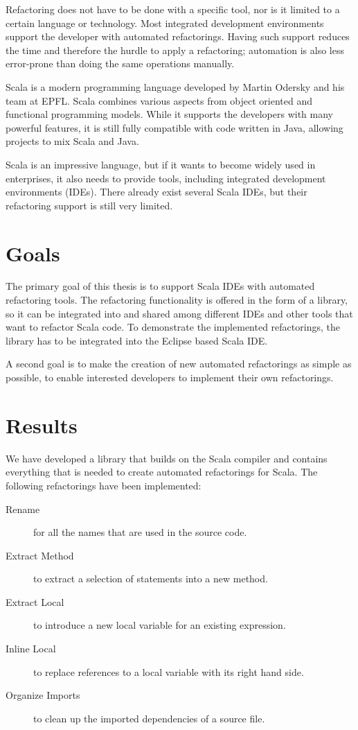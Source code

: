 \documentclass[10pt,a4paper,oneside]{scrreprt}
\begin{document}
Refactoring does not have to be done with a specific tool, nor is it limited to a certain language or technology. Most integrated development environments support the developer with automated refactorings. Having such support reduces the time and therefore the hurdle to apply a refactoring; automation is also less error-prone than doing the same operations manually.

Scala is a modern programming language developed by Martin Odersky and his team at EPFL. Scala combines various aspects from object oriented and functional programming models. While it supports the developers with many powerful features, it is still fully compatible with code written in Java, allowing projects to mix Scala and Java.

Scala is an impressive language, but if it wants to become widely used in enterprises, it also needs to provide tools, including integrated development environments (IDEs). There already exist several Scala IDEs, but their refactoring support is still very limited.

\section*{Goals}

The primary goal of this thesis is to support Scala IDEs with automated refactoring tools. The refactoring functionality is offered in the form of a library, so it can be integrated into and shared among different IDEs and other tools that want to refactor Scala code. To demonstrate the implemented refactorings, the library has to be integrated into the Eclipse based Scala IDE. 

A second goal is to make the creation of new automated refactorings as simple as possible, to enable interested developers to implement their own refactorings. 

\section*{Results}

We have developed a library that builds on the Scala compiler and contains everything that is needed to create automated refactorings for Scala. The following refactorings have been implemented: 

\begin{description}
  \item[Rename] for all the names that are used in the source code.
  \item[Extract Method] to extract a selection of statements into a new method.
  \item[Extract Local] to introduce a new local variable for an existing expression.
  \item[Inline Local] to replace references to a local variable with its right hand side.
  \item[Organize Imports] to clean up the imported dependencies of a source file.
 \end{description}
\end{document}
